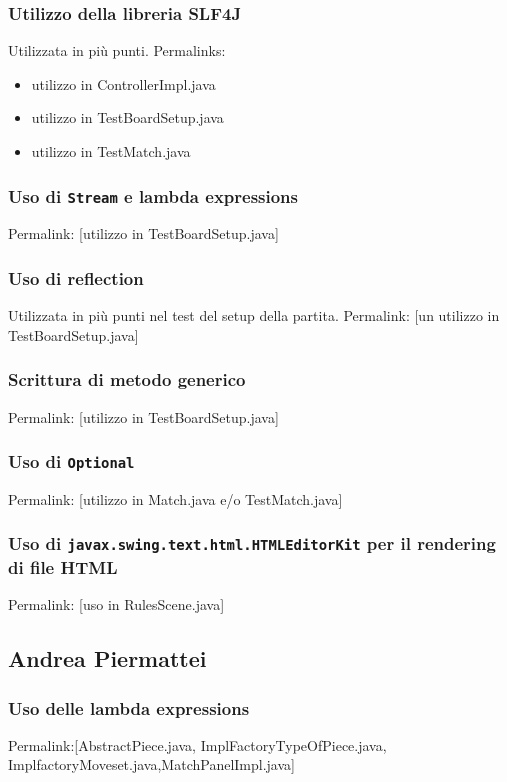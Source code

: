 \documentclass[a4paper,12pt]{report}
\begin{document}
\subsubsection{Utilizzo della libreria SLF4J}
Utilizzata in più punti. Permalinks:
\begin{itemize}
	\item utilizzo in ControllerImpl.java
	\item utilizzo in TestBoardSetup.java
	\item utilizzo in TestMatch.java
\end{itemize}

\subsubsection{Uso di \texttt{Stream} e lambda expressions}
Permalink: [utilizzo in TestBoardSetup.java]

\subsubsection{Uso di reflection}
Utilizzata in più punti nel test del setup della partita.
Permalink: [un utilizzo in TestBoardSetup.java]

\subsubsection{Scrittura di metodo generico}
Permalink: [utilizzo in TestBoardSetup.java]

\subsubsection{Uso di \texttt{Optional}}
Permalink: [utilizzo in Match.java e/o TestMatch.java]

\subsubsection{Uso di \texttt{javax.swing.text.html.HTMLEditorKit} per il rendering di file HTML}
Permalink: [uso in RulesScene.java]

\subsection{Andrea Piermattei}
\subsubsection{Uso delle lambda expressions}
Permalink:[AbstractPiece.java, ImplFactoryTypeOfPiece.java, ImplfactoryMoveset.java,MatchPanelImpl.java]
\end{document}
